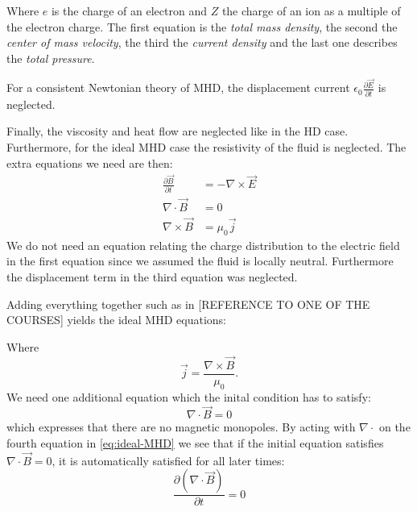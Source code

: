 Where $e$ is the charge of an electron and $Z$ the charge of an ion as a multiple of the electron charge. The first equation is the \emph{total mass density}, the second the \emph{center of mass velocity}, the third the \emph{current density} and the last one describes the \emph{total pressure}.

For a consistent Newtonian theory of MHD, the displacement current $\epsilon_0 \frac{\partial \vec{E}}{\partial t}$ is neglected. 

Finally, the viscosity and heat flow are neglected like in the HD case. Furthermore, for the ideal MHD case the resistivity of the fluid is neglected. The extra equations we need are then:
\begin{align*}
	\frac{\partial \vec{B}}{\partial t} &= - \nabla \times \vec{E}\\
	\nabla \cdot \vec{B} &= 0\\
	\nabla \times \vec{B} &= \mu_0 \vec{j}
\end{align*}
We do not need an equation relating the charge distribution to the electric field in the first equation since we assumed the fluid is locally neutral.
Furthermore the displacement term in the third equation was neglected.

Adding everything together such as in [REFERENCE TO ONE OF THE COURSES] yields the ideal MHD equations:

{\centering 
\noindent {}
\par}

Where $$\vec{j} = \frac{\nabla\times \vec{B}}{\mu_0}. $$ We need one additional equation which the inital condition has to satisfy:
\begin{equation*}
	\nabla\cdot\vec{B}=0
\end{equation*}
which expresses that there are no magnetic monopoles. By acting with $\nabla\cdot$ on the fourth equation in \autoref{eq:ideal-MHD} we see that if the initial equation satisfies $\nabla\cdot\vec{B}=0$, it is automatically satisfied for all later times:
\begin{equation*}
	\frac{\partial (\nabla\cdot\vec{B})}{\partial t} = 0
\end{equation*}

